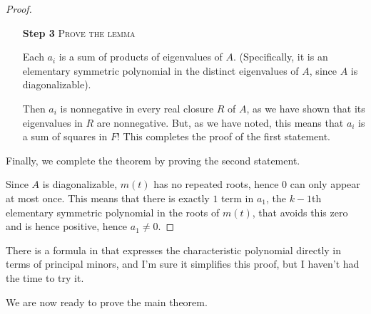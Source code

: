 \documentclass{article}
\begin{document}
\begin{proof}
\begin{itemize}
        \item[\textbf{Step 3}]
            \textsc{\color{Crimson} Prove the lemma}

            Each $a_i$ is a sum of products of eigenvalues of $A$.
            (Specifically, it is an elementary symmetric polynomial in the distinct eigenvalues of $A$, since $A$ is diagonalizable).

            Then $a_i$ is nonnegative in every real closure $R$ of $A$, as we have shown that its eigenvalues in $R$ are nonnegative.
            But, as we have noted, this means that $a_i$ is a sum of squares in $F$!
            This completes the proof of the first statement.
    \end{itemize}

    Finally, we complete the theorem by proving the second statement.

    Since $A$ is diagonalizable, $m(t)$ has no repeated roots, hence $0$ can only appear at most once. 
    This means that there is exactly $1$ term in $a_1$, the $k-1$th elementary symmetric polynomial in the roots of $m(t)$, that avoids this zero and is hence positive, hence $a_1 \neq 0$.
\end{proof}

There is a formula in \cite{HornJohnson} that expresses the characteristic polynomial directly in terms of principal minors, and I'm sure it simplifies this proof, but I haven't had the time to try it.

We are now ready to prove the main theorem.
\end{document}
